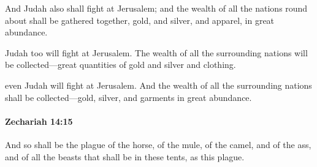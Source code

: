 			\begin{versebox}
					\item[BHS] 
					\item[LXX] 
					\item[ASV] And Judah also shall fight at Jerusalem; and the wealth of all the nations round about shall be gathered together, gold, and silver, and apparel, in great abundance.
					\item[NIV] Judah too will fight at Jerusalem. The wealth of all the surrounding nations will be collected—great quantities of gold and silver and clothing.
					\item[NRSV] even Judah will fight at Jerusalem. And the wealth of all the surrounding nations shall be collected—gold, silver, and garments in great abundance.
			\end{versebox}

		\paragraph{Zechariah 14:15} %
			\label{ZECHARIAH-14-15}

			And so shall be the plague of the horse, of the mule, of the camel, and of the ass, and of all the beasts that shall be in these tents, as this plague.

